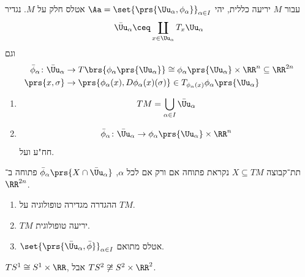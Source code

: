 \documentclass[a4paper,10pt,twoside,openany]{book}
\begin{document}
\begin{definition}
עבור
$M$
יריעה כללית, יהי
$\Aa = \set{\prs{\Uu_{\alpha}, \phi_{\alpha}}}_{\alpha \in I}$
אטלס חלק על
$M$.
נגדיר
\[\bar{\Uu}_{\alpha} \ceq \coprod_{x \in \Uu_{\alpha}} T_x \Uu_{\alpha}\]
וגם
\begin{align*}
\bar{\phi}_{\alpha} \colon \bar{\Uu}_{\alpha} &\to T\brs{\phi_{\alpha}\prs{\Uu_{\alpha}}} \cong \phi_{\alpha}\prs{\Uu_{\alpha}}\times \RR^n \subseteq \RR^{2n} \\
\prs{x, \sigma} &\to \prs{\phi_{\alpha}(x), D\phi_{\alpha}(x)(\sigma)} \in T_{\phi_{\alpha}(x)}\phi_{\alpha}\prs{\Uu_{\alpha}}
\end{align*}
\end{definition}

\begin{exercise}
\begin{enumerate}
\item \[TM = \bigcup_{\alpha \in I} \bar{\Uu}_{\alpha}\]
\item \[\bar{\phi}_{\alpha} \colon \bar{\Uu}_{\alpha} \to \phi_{\alpha}\prs{\Uu_{\alpha}}\times \RR^n\]
חח"ע ועל.
\end{enumerate}
\end{exercise}
\begin{definition}
תת־קבוצה
$X \subseteq TM$
נקראת פתוחה אם ורק אם לכל
$\alpha$,
$\bar{\phi}_{\alpha}\prs{X \cap \bar{\Uu}_{\alpha}}$
פתוחה ב־%
$\RR^{2n}$.
\end{definition}
\begin{exercise}
\begin{enumerate}
הראו בשלבים הבאים כי יש מבנה חלק על
$TM$.
\item ההגדרה מגדירה טופולוגיה על
$TM$.
\item $TM$
יריעה טופולוגית.
\item $\set{\prs{\bar{\Uu}_{\alpha}, \bar{\phi}}}_{\alpha \in I}$
אטלס מתואם.
\end{enumerate}
\end{exercise}
\begin{remark}
$TS^{1} \cong S^1 \times \RR$,
אבל
$TS^2 \not\cong S^2 \times \RR^2$.
\end{remark}
\backmatter
\end{document}
